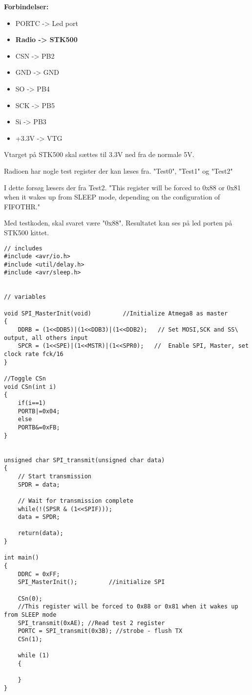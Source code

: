 \documentclass[Main]{subfiles}
\begin{document}
\textbf{Forbindelser:}
\begin{itemize}
\item PORTC -> Led port
\end{itemize}

\begin{itemize}
\item \textbf{Radio -> 	STK500}
\item CSN	->	PB2
\item GND	->	GND
\item SO	->	PB4
\item SCK	->	PB5
\item Si	->	PB3
\item +3.3V	->	VTG
\end{itemize}


Vtarget på STK500 skal sættes til 3.3V ned fra de normale 5V.

Radioen har nogle test register der kan læses fra. "Test0", "Test1" og "Test2" 

I dette forsøg læsers der fra Test2.
"This register will be forced to 0x88 or 0x81 when it wakes up from
SLEEP mode, depending on the configuration of FIFOTHR." \cite{TI-cc1101}

Med testkoden, skal svaret være "0x88". Resultatet kan ses på led porten på STK500 kittet.

\begin{lstlisting}[caption=SPI test, style=Code-C, label=lst:itocLEs]
// includes
#include <avr/io.h>
#include <util/delay.h>
#include <avr/sleep.h>


// variables

void SPI_MasterInit(void)         //Initialize Atmega8 as master
{
	DDRB = (1<<DDB5)|(1<<DDB3)|(1<<DDB2);   // Set MOSI,SCK and SS\ output, all others input
	SPCR = (1<<SPE)|(1<<MSTR)|(1<<SPR0);   //  Enable SPI, Master, set clock rate fck/16
}

//Toggle CSn
void CSn(int i)
{
	if(i==1)
	PORTB|=0x04;
	else
	PORTB&=0xFB;
}


unsigned char SPI_transmit(unsigned char data)
{
	// Start transmission
	SPDR = data;

	// Wait for transmission complete
	while(!(SPSR & (1<<SPIF)));
	data = SPDR;

	return(data);
}

int main()
{
    DDRC = 0xFF;
	SPI_MasterInit();         //initialize SPI
	
	CSn(0);
	//This register will be forced to 0x88 or 0x81 when it wakes up from SLEEP mode
	SPI_transmit(0xAE); //Read test 2 register
	PORTC = SPI_transmit(0x3B); //strobe - flush TX
	CSn(1);

	while (1)
	{

	}
}
\end{lstlisting}
\end{document}
